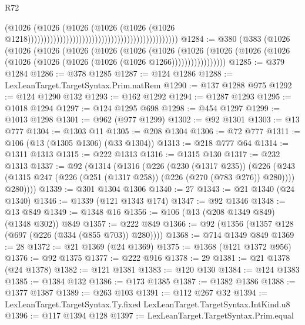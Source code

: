 \begin{lexlean}{R72}
\begin{coremodule}
                                                                                      (@1026
                                                                                        (@1026
                                                                                          (@1026
                                                                                            (@1026
                                                                                              (@1026
                                                                                                (@1026
                                                                                                  @1218)))))))))))))))))))))))))))))))))))))))))))))))
@1284 := @380
    (@383
      (@1026
        (@1026
          (@1026
            (@1026
              (@1026
                (@1026
                  (@1026
                    (@1026
                      (@1026 (@1026 (@1026 (@1026 (@1026 (@1026 (@1026 (@1026 @1266)))))))))))))))))
@1285 := @379 @1284
@1286 := @378 @1285
@1287 := @124 @1286
@1288 := LexLeanTarget.TargetSyntax.Prim.natRem
@1290 := @137 @1288 @975
@1292 := @124 @1290 @132
@1293 := @162 @1292
@1294 := @1287 @1293
@1295 := @1018 @1294
@1297 := @124 @1295 @698
@1298 := @454 @1297
@1299 := @1013 @1298
@1301 := @962 (@977 @1299)
@1302 := @92 @1301
@1303 := @13 @777
@1304 := @1303 @11
@1305 := @208 @1304
@1306 := @72 @777
@1311 := @106 (@13 (@1305 @1306) (@33 @1304))
@1313 := @218 @777 @64
@1314 := @1311 @1313
@1315 := @222 @1313
@1316 := @1315 @130
@1317 := @232 @1313
@1337 := @92
    (@1314
      (@1316
        (@226
          (@230 (@1317 @235))
          (@226
            (@243 (@1315 @247 (@226 (@251 (@1317 @258)) (@226 (@270 (@783 @276)) @280))))
            @280))))
@1339 := @301 @1304 @1306
@1340 := 27
@1343 := @21 @1340 (@24 @1340)
@1346 := @1339 (@121 @1343 @174)
@1347 := @92 @1346
@1348 := @13 @849
@1349 := @1348 @16
@1356 := @106 (@13 (@208 @1349 @849) (@1348 @302)) @849
@1357 := @222 @849
@1366 := @92 (@1356 (@1357 @128 (@697 (@226 (@334 (@855 @703)) @280))))
@1368 := @714 @1349 @849
@1369 := 28
@1372 := @21 @1369 (@24 @1369)
@1375 := @1368 (@121 @1372 @956)
@1376 := @92 @1375
@1377 := @222 @916
@1378 := 29
@1381 := @21 @1378 (@24 @1378)
@1382 := @121 @1381
@1383 := @120 @130
@1384 := @124 @1383
@1385 := @1384 @132
@1386 := @173 @1385
@1387 := @1382 @1386
@1388 := @1377 @1387
@1389 := @263 @103
@1391 := @112 @267 @32
@1394 := LexLeanTarget.TargetSyntax.Ty.fixed LexLeanTarget.TargetSyntax.IntKind.u8
@1396 := @117 @1394 @128
@1397 := LexLeanTarget.TargetSyntax.Prim.equal

\end{coremodule}
\end{lexlean}
